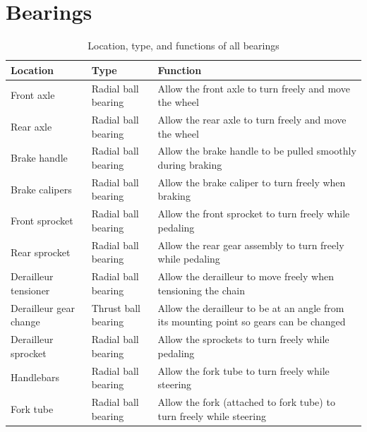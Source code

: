 \documentclass[11pt]{article}
\begin{document}
\section*{Bearings}
\begin{table}[H]
	\centering
	\begin{tabular}{|l|l|p{3.5in}|}
		\hline
		\textbf{Location} & \textbf{Type} & \textbf{Function} \\
		\hline
		Front axle & Radial ball bearing & Allow the front axle to turn freely and move the wheel \\
		\hline
		Rear axle & Radial ball bearing & Allow the rear axle to turn freely and move the wheel \\
		\hline
		Brake handle & Radial ball bearing & Allow the brake handle to be pulled smoothly during braking \\
		\hline
		Brake calipers & Radial ball bearing & Allow the brake caliper to turn freely when braking \\
		\hline
		Front sprocket & Radial ball bearing & Allow the front sprocket to turn freely while pedaling \\
		\hline
		Rear sprocket & Radial ball bearing & Allow the rear gear assembly to turn freely while pedaling \\
		\hline
		Derailleur tensioner & Radial ball bearing & Allow the derailleur to move freely when tensioning the chain \\
		\hline
		Derailleur gear change & Thrust ball bearing & Allow the derailleur to be at an angle from its mounting point so gears can be changed \\
		\hline
		Derailleur sprocket & Radial ball bearing & Allow the sprockets to turn freely while pedaling \\
		\hline
		Handlebars & Radial ball bearing & Allow the fork tube to turn freely while steering \\
		\hline
		Fork tube & Radial ball bearing & Allow the fork (attached to fork tube) to turn freely while steering \\
		\hline
	\end{tabular}
	\caption{Location, type, and functions of all bearings}
\end{table}
\end{document}
